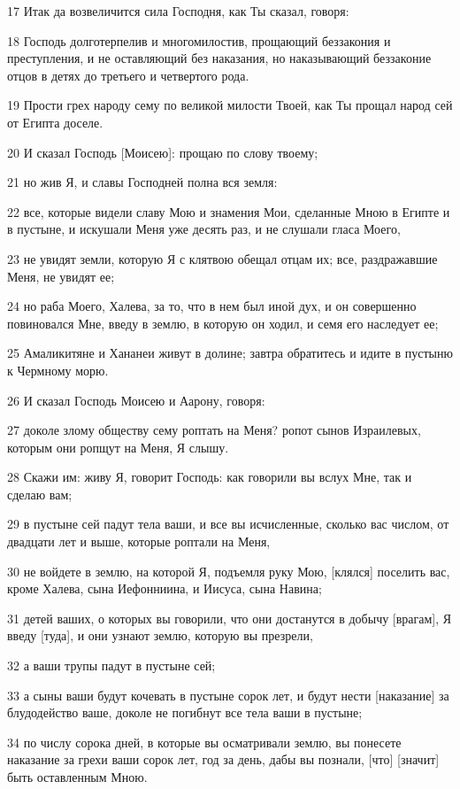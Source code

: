 \par 17 Итак да возвеличится сила Господня, как Ты сказал, говоря:
\par 18 Господь долготерпелив и многомилостив, прощающий беззакония и преступления, и не оставляющий без наказания, но наказывающий беззаконие отцов в детях до третьего и четвертого рода.
\par 19 Прости грех народу сему по великой милости Твоей, как Ты прощал народ сей от Египта доселе.
\par 20 И сказал Господь [Моисею]: прощаю по слову твоему;
\par 21 но жив Я, и славы Господней полна вся земля:
\par 22 все, которые видели славу Мою и знамения Мои, сделанные Мною в Египте и в пустыне, и искушали Меня уже десять раз, и не слушали гласа Моего,
\par 23 не увидят земли, которую Я с клятвою обещал отцам их; все, раздражавшие Меня, не увидят ее;
\par 24 но раба Моего, Халева, за то, что в нем был иной дух, и он совершенно повиновался Мне, введу в землю, в которую он ходил, и семя его наследует ее;
\par 25 Амаликитяне и Хананеи живут в долине; завтра обратитесь и идите в пустыню к Чермному морю.
\par 26 И сказал Господь Моисею и Аарону, говоря:
\par 27 доколе злому обществу сему роптать на Меня? ропот сынов Израилевых, которым они ропщут на Меня, Я слышу.
\par 28 Скажи им: живу Я, говорит Господь: как говорили вы вслух Мне, так и сделаю вам;
\par 29 в пустыне сей падут тела ваши, и все вы исчисленные, сколько вас числом, от двадцати лет и выше, которые роптали на Меня,
\par 30 не войдете в землю, на которой Я, подъемля руку Мою, [клялся] поселить вас, кроме Халева, сына Иефонниина, и Иисуса, сына Навина;
\par 31 детей ваших, о которых вы говорили, что они достанутся в добычу [врагам], Я введу [туда], и они узнают землю, которую вы презрели,
\par 32 а ваши трупы падут в пустыне сей;
\par 33 а сыны ваши будут кочевать в пустыне сорок лет, и будут нести [наказание] за блудодейство ваше, доколе не погибнут все тела ваши в пустыне;
\par 34 по числу сорока дней, в которые вы осматривали землю, вы понесете наказание за грехи ваши сорок лет, год за день, дабы вы познали, [что] [значит] быть оставленным Мною.
